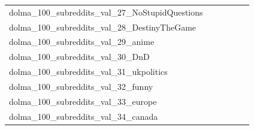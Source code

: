 \documentclass[dvipsnames]{article}
\begin{document}
\begin{appendix}
{\begin{longtable}{m{6cm}m{1.7cm}m{1.7cm}m{1.7cm}m{1.7cm}m{1.7cm}}
	dolma\_100\_subreddits\_val\_27\_NoStupidQuestions  & \colorbox[HTML]{ffffe5}{\makebox[\mywidth][c]{19.66}} & \colorbox[HTML]{aadc8d}{\makebox[\mywidth][c]{18.59}} & \colorbox[HTML]{ffffe5}{\makebox[\mywidth][c]{19.87}} & \colorbox[HTML]{d1ec9f}{\makebox[\mywidth][c]{18.68}} & \colorbox[HTML]{77c578}{\makebox[\mywidth][c]{18.52}}\\
	dolma\_100\_subreddits\_val\_28\_DestinyTheGame  & \colorbox[HTML]{ffffe5}{\makebox[\mywidth][c]{35.27}} & \colorbox[HTML]{bae294}{\makebox[\mywidth][c]{33.58}} & \colorbox[HTML]{ffffe5}{\makebox[\mywidth][c]{36.13}} & \colorbox[HTML]{dff2a7}{\makebox[\mywidth][c]{33.78}} & \colorbox[HTML]{77c578}{\makebox[\mywidth][c]{33.37}}\\
	dolma\_100\_subreddits\_val\_29\_anime  & \colorbox[HTML]{ffffe5}{\makebox[\mywidth][c]{23.21}} & \colorbox[HTML]{e3f4aa}{\makebox[\mywidth][c]{22.04}} & \colorbox[HTML]{ffffe5}{\makebox[\mywidth][c]{23.46}} & \colorbox[HTML]{eff8b3}{\makebox[\mywidth][c]{22.12}} & \colorbox[HTML]{77c578}{\makebox[\mywidth][c]{21.77}}\\
	dolma\_100\_subreddits\_val\_30\_DnD  & \colorbox[HTML]{ffffe5}{\makebox[\mywidth][c]{28.22}} & \colorbox[HTML]{daf0a4}{\makebox[\mywidth][c]{26.71}} & \colorbox[HTML]{ffffe5}{\makebox[\mywidth][c]{28.78}} & \colorbox[HTML]{dcf1a5}{\makebox[\mywidth][c]{26.72}} & \colorbox[HTML]{77c578}{\makebox[\mywidth][c]{26.39}}\\
	dolma\_100\_subreddits\_val\_31\_ukpolitics  & \colorbox[HTML]{ffffe5}{\makebox[\mywidth][c]{22.35}} & \colorbox[HTML]{a9db8c}{\makebox[\mywidth][c]{21.19}} & \colorbox[HTML]{ffffe5}{\makebox[\mywidth][c]{22.80}} & \colorbox[HTML]{d4eea0}{\makebox[\mywidth][c]{21.31}} & \colorbox[HTML]{77c578}{\makebox[\mywidth][c]{21.10}}\\
	dolma\_100\_subreddits\_val\_32\_funny  & \colorbox[HTML]{ffffe5}{\makebox[\mywidth][c]{20.78}} & \colorbox[HTML]{dcf1a5}{\makebox[\mywidth][c]{19.45}} & \colorbox[HTML]{ffffe5}{\makebox[\mywidth][c]{20.70}} & \colorbox[HTML]{ceeb9e}{\makebox[\mywidth][c]{19.40}} & \colorbox[HTML]{77c578}{\makebox[\mywidth][c]{19.23}}\\
	dolma\_100\_subreddits\_val\_33\_europe  & \colorbox[HTML]{ffffe5}{\makebox[\mywidth][c]{21.76}} & \colorbox[HTML]{a2d889}{\makebox[\mywidth][c]{20.59}} & \colorbox[HTML]{ffffe5}{\makebox[\mywidth][c]{22.10}} & \colorbox[HTML]{d5eea1}{\makebox[\mywidth][c]{20.72}} & \colorbox[HTML]{77c578}{\makebox[\mywidth][c]{20.52}}\\
	dolma\_100\_subreddits\_val\_34\_canada  & \colorbox[HTML]{ffffe5}{\makebox[\mywidth][c]{22.44}} & \colorbox[HTML]{c2e698}{\makebox[\mywidth][c]{21.21}} & \colorbox[HTML]{ffffe5}{\makebox[\mywidth][c]{22.44}} & \colorbox[HTML]{e2f3a9}{\makebox[\mywidth][c]{21.30}} & \colorbox[HTML]{77c578}{\makebox[\mywidth][c]{21.09}}\\

\end{longtable}}
\end{appendix}
\end{document}
